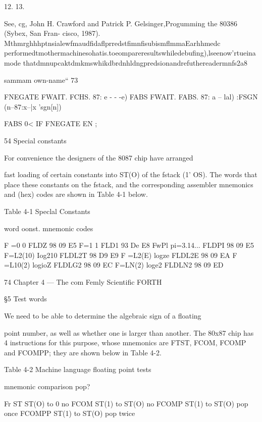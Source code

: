  

12.
13.

See, cg, John H. Crawford and Patrick P. Gelsinger,Progumming the 80386 (Sybex, San Fran-
cisco, 1987).
MthmrghhhptnsialewfmaudﬁdaﬂprredstﬁmnﬁsubismﬂmmaEarhhmedc
performedtmothermachinesohatis.toeompareresultswhiledebuﬁng),lseenow'rtueinamode
thatdmnupcaktdmkmswhikdbrdnhldngpredsionandrefuthereadermnfs2a8

sammam own-name“ 73

FNEGATE FWAIT. FCHS. 87: e - - -e)
FABS FWAIT. FABS. 87: a -- lal)
:FSGN (n--87:x--|x 'sgn[n])

FABS 0< IF FNEGATE EN ;

54 Special constants

For convenience the designers of the 8087 chip have arranged

fast loading of certain constants into ST(O) of the fstack (1' OS).
The words that place these constants on the fstack, and the
corresponding assembler mnemonics and (hex) codes are shown
in Table 4-1 below.

 

Table 4-1 Speclal Constants

word oonst. mnemonic codes

F =0 0 FLDZ 98 09 E5
F=1 1 FLD1 93 De E8
FwPl pi=3.14... FLDPI 98 09 E5
F=L2(10) Iog210 FLDL2T 98 D9 E9
F =L2(E) logze FLDL2E 98 09 EA
F =L10(2) logioZ FLDLG2 98 09 EC
F=LN(2) loge2 FLDLN2 98 09 ED

 

 

 

74 Chapter 4 — The com Femly Scientific FORTH

§5 Test words

We need to be able to determine the algebraic sign of a ﬂoating

point number, as well as whether one is larger than another.
The 80x87 chip has 4 instructions for this purpose, whose
mnemonics are FTST, FCOM, FCOMP and FCOMPP; they are
shown below in Table 4-2.

Table 4-2 Machine language ﬂoating point tests

 

mnemonic comparison pop?

Fr ST ST(O) to 0 no
FCOM ST(1) to ST(O) no
FCOMP ST(1) to ST(O) pop once
FCOMPP ST(1) to ST(O) pop twice

 

 

 

